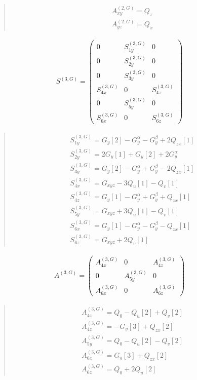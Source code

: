 \documentclass[fleqn,10pt]{jsarticle}
\begin{document}
\begin{quote}
\begin{align*}
& A^{(2,G)}_{xy} = Q_{z} \\
& A^{(2,G)}_{yz} = Q_{x}
\end{align*}
\end{quote}
\begin{align*}
S^{(3,G)} = \begin{pmatrix} 0 & S^{(3,G)}_{1y} & 0 \\ 0 & S^{(3,G)}_{2y} & 0 \\ 0 & S^{(3,G)}_{3y} & 0 \\ S^{(3,G)}_{4x} & 0 & S^{(3,G)}_{4z} \\ 0 & S^{(3,G)}_{5y} & 0 \\ S^{(3,G)}_{6x} & 0 & S^{(3,G)}_{6z} \end{pmatrix}
\end{align*}
\begin{quote}
\begin{align*}
& S^{(3,G)}_{1y} = G_{y}[2] - G_{y}^{\alpha} - G_{y}^{\beta} + 2 Q_{zx}[1] \\
& S^{(3,G)}_{2y} = 2 G_{y}[1] + G_{y}[2] + 2 G_{y}^{\alpha} \\
& S^{(3,G)}_{3y} = G_{y}[2] - G_{y}^{\alpha} + G_{y}^{\beta} - 2 Q_{zx}[1] \\
& S^{(3,G)}_{4x} = G_{xyz} - 3 Q_{u}[1] - Q_{v}[1] \\
& S^{(3,G)}_{4z} = G_{y}[1] - G_{y}^{\alpha} + G_{y}^{\beta} + Q_{zx}[1] \\
& S^{(3,G)}_{5y} = G_{xyz} + 3 Q_{u}[1] - Q_{v}[1] \\
& S^{(3,G)}_{6x} = G_{y}[1] - G_{y}^{\alpha} - G_{y}^{\beta} - Q_{zx}[1] \\
& S^{(3,G)}_{6z} = G_{xyz} + 2 Q_{v}[1]
\end{align*}
\end{quote}
\begin{align*}
A^{(3,G)} = \begin{pmatrix} A^{(3,G)}_{4x} & 0 & A^{(3,G)}_{4z} \\ 0 & A^{(3,G)}_{5y} & 0 \\ A^{(3,G)}_{6x} & 0 & A^{(3,G)}_{6z} \end{pmatrix}
\end{align*}
\begin{quote}
\begin{align*}
& A^{(3,G)}_{4x} = Q_{0} - Q_{u}[2] + Q_{v}[2] \\
& A^{(3,G)}_{4z} = - G_{y}[3] + Q_{zx}[2] \\
& A^{(3,G)}_{5y} = Q_{0} - Q_{u}[2] - Q_{v}[2] \\
& A^{(3,G)}_{6x} = G_{y}[3] + Q_{zx}[2] \\
& A^{(3,G)}_{6z} = Q_{0} + 2 Q_{u}[2]
\end{align*}
\end{quote}
\end{document}
